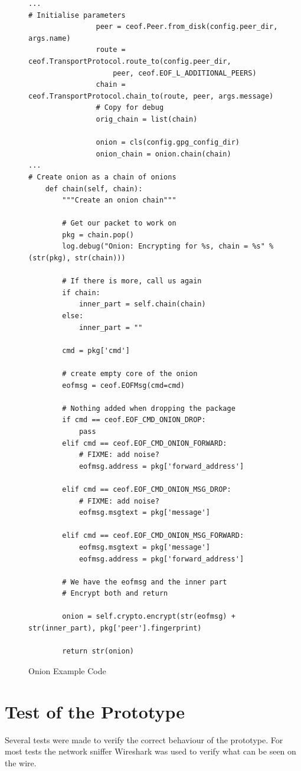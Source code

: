 \begin{figure}[htb]
\caption{Onion Example Code}
\label{onionexample}
\begin{verbatim}
...
# Initialise parameters
                peer = ceof.Peer.from_disk(config.peer_dir, args.name)
                route = ceof.TransportProtocol.route_to(config.peer_dir, 
                    peer, ceof.EOF_L_ADDITIONAL_PEERS)
                chain = ceof.TransportProtocol.chain_to(route, peer, args.message)
                # Copy for debug
                orig_chain = list(chain)

                onion = cls(config.gpg_config_dir)
                onion_chain = onion.chain(chain)
...
# Create onion as a chain of onions
    def chain(self, chain):
        """Create an onion chain"""

        # Get our packet to work on
        pkg = chain.pop()
        log.debug("Onion: Encrypting for %s, chain = %s" % (str(pkg), str(chain)))

        # If there is more, call us again
        if chain:
            inner_part = self.chain(chain)
        else:
            inner_part = ""

        cmd = pkg['cmd']

        # create empty core of the onion
        eofmsg = ceof.EOFMsg(cmd=cmd)

        # Nothing added when dropping the package
        if cmd == ceof.EOF_CMD_ONION_DROP:
            pass
        elif cmd == ceof.EOF_CMD_ONION_FORWARD:
            # FIXME: add noise?
            eofmsg.address = pkg['forward_address']

        elif cmd == ceof.EOF_CMD_ONION_MSG_DROP:
            # FIXME: add noise?
            eofmsg.msgtext = pkg['message']
            
        elif cmd == ceof.EOF_CMD_ONION_MSG_FORWARD:
            eofmsg.msgtext = pkg['message']
            eofmsg.address = pkg['forward_address']

        # We have the eofmsg and the inner part
        # Encrypt both and return

        onion = self.crypto.encrypt(str(eofmsg) + str(inner_part), pkg['peer'].fingerprint)

        return str(onion)
\end{verbatim}
\end{figure}
\section{Test of the Prototype}
Several tests were made to verify the correct behaviour of the prototype.
For most tests the network sniffer Wireshark was used to verify what can be
seen on the wire.
